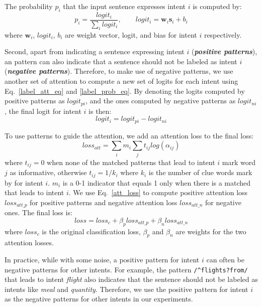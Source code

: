 The probability $p_i$ that the input sentence expresses intent $i$ is computed by:
\begin{equation}
p_i = \frac{logit_i}{\sum_{i}{logit_i}}, \quad\quad logit_i=\textbf{w}_i\textbf{s}_i + b_i 
\label{label_prob_eq}
\end{equation}
where $\textbf{w}_i$, $logit_i$, $b_i$ are weight vector, logit, and bias for intent $i$ respectively.

Second, apart from indicating a sentence expressing intent $i$ (\textbf{\emph{positive patterns}}), an \RE pattern can also indicate that a sentence should not be labeled as intent $i$ (\textbf{\emph{negative patterns}}). Therefore, to make use of negative patterns, we use another set of attention to compute a new set of logits for each intent using Eq.~\ref{label_att_eq} and \ref{label_prob_eq}. By denoting the logits computed by positive patterns as $logit_{pi}$, and the ones computed by negative patterns as $logit_{ni}$, the final logit for intent $i$ is then: 
\begin{equation}
logit_i = logit_{pi} - logit_{ni}
\end{equation}

To use \RE patterns to guide the attention, we add an attention loss to the final loss:
\begin{equation}
loss_{att} = \sum_{i}{m_i\sum_{j}{t_{ij}log(\alpha_{ij})}}
\label{att_loss}
\end{equation}
where $t_{ij} = 0$ when none of the matched patterns that lead to intent $i$ mark word $j$ as informative, otherwise $t_{ij} = 1/k_{i}$ where $k_i$ is the number of clue words mark by \RE for intent $i$. $m_i$ is a 0-1 indicator that equals 1 only when there is a matched \RE that leads to intent $i$. We use Eq.~\ref{att_loss} to compute positive attention loss $loss_{att\_p}$ for positive patterns and negative attention loss $loss_{att\_n}$ for negative ones. The final loss is:
\begin{equation}
loss = loss_{c} + \beta_p loss_{att\_p} + \beta_n loss_{att\_n}
\end{equation} 
where $loss_{c}$ is the original classification loss, $\beta_p$ and $\beta_n$ are weights for the two attention losses.

In practice, while with some noise, a positive pattern for intent $i$ can often be negative patterns for other intents. For example, the pattern \texttt{/\textasciicircum flights?\:from/} that leads to intent \emph{flight} also indicates that the sentence should not be labeled as intents like \emph{meal} and \emph{quantity}.
Therefore, we use the positive pattern for intent $i$ as the negative patterns for other intents in our experiments.

